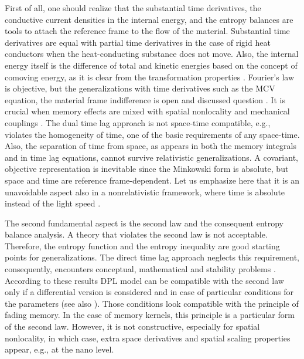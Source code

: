 \documentclass[sn-mathphys]{sn-jnl}%
\theoremstyle{thmstyleone}%
\theoremstyle{thmstyletwo}%
\theoremstyle{thmstylethree}%
\begin{document}
{First of all, one should realize that the substantial time derivatives, the conductive current densities in the internal energy, and the entropy balances are tools to attach the reference frame to the flow of the material. Substantial time derivatives are equal with partial time derivatives in the case of rigid heat conductors when the heat-conducting substance does not move. Also, the internal energy itself is the difference of total and kinetic energies based on the concept of comoving energy, as it is clear from the transformation properties \cite{VanEta19a}. Fourier's law is objective, but the generalizations with time derivatives such as the MCV equation, the material frame indifference is open and discussed question \cite{Mul72a,ChrJor05a,Chr09a}. It is crucial when memory effects are mixed with spatial nonlocality and mechanical couplings \cite{Van17a,Van20a1}. The dual time lag approach is not space-time compatible, e.g., violates the homogeneity of time, one of the basic requirements of any space-time. Also, the separation of time from space, as appears in both the memory integrals and in time lag equations, cannot survive relativistic generalizations. A covariant, objective representation is inevitable since the Minkowski form is absolute, but space and time are reference frame-dependent. Let us emphasize here that it is an unavoidable aspect also in a nonrelativistic framework, where time is absolute instead of the light speed \cite{Van17a,VanEta17a}.

The second fundamental aspect is the second law and the consequent entropy balance analysis. A theory that violates the second law is not acceptable. Therefore, the entropy function and the entropy inequality are good starting points for generalizations. The direct time lag approach neglects this requirement, consequently, encounters conceptual, mathematical and stability { problems \cite{DreEta09a,FabLaz14a,FabFra14a,RukSam13a,Ruk14a,FabEtal16,Ruk17a,ChiEta17a,KovVan18a1}. }According to these results DPL model can be compatible with the second law only if a differential version is considered and in case of particular conditions for the parameters (see also \cite{AskEta18a}). Those conditions look compatible with the principle of fading memory. In the case of memory kernels, this principle is a particular form of the second law. However, it is not constructive, especially for spatial nonlocality, in which case, extra space derivatives and spatial scaling properties appear, e.g., at the nano level.

}
\end{document}
